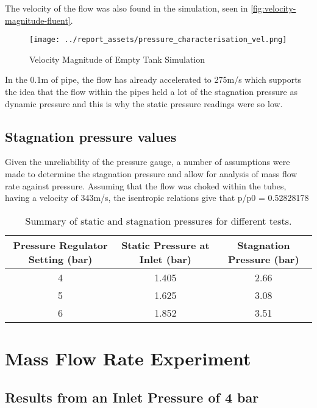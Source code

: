 The velocity of the flow was also found in the simulation, seen in \autoref{fig:velocity-magnitude-fluent}.
\begin{figure}[htbp]
    \centering
    
    \begin{minipage}{0.9\textwidth}
        \centering
        \texttt{[image: ../report\_assets/pressure\_characterisation\_vel.png]}
        \caption{Velocity Magnitude of Empty Tank Simulation}\label{fig:velocity-magnitude-fluent}
    \end{minipage}    
    
\end{figure}    
In the 0.1m of pipe, the flow has already accelerated to 275m/s which supports the idea that the flow within the pipes held a lot of the stagnation pressure as dynamic pressure and this is why the static pressure readings were so low.
\subsection{Stagnation pressure values}
Given the unreliability of the pressure gauge, a number of assumptions were made to determine the stagnation pressure and allow for analysis of mass flow rate against pressure. Assuming that the flow was choked within the tubes, having a velocity of 343m/s, the isentropic relations give that p/p0 =  0.52828178
\begin{table}[htbp]
    \centering
    \begin{tabular}{|c|c|c|}
        \hline
        Pressure Regulator Setting (bar) & Static Pressure at Inlet (bar) &  Stagnation Pressure (bar) \\
        \hline
        4 & 1.405 & 2.66 \\
        5 & 1.625 & 3.08 \\
        6 & 1.852 & 3.51 \\
        \hline
    \end{tabular}    
    \caption{Summary of static and stagnation pressures for different tests.}\label{tab:static-stag-pressures}
\end{table}    


\newpage
\section{Mass Flow Rate Experiment}
\subsection{Results from an Inlet Pressure of 4 bar}
\vfill

